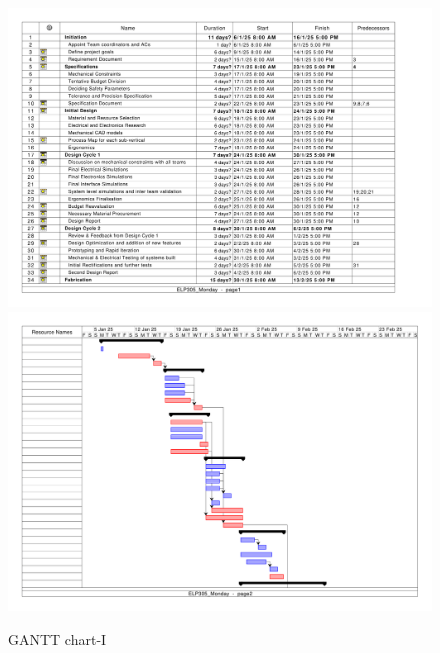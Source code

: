 \documentclass[12pt,a4paper]{article}
\begin{document}
\clearpage

\begin{figure}[H]
    \centering
    \includegraphics[width=1.2\textwidth]{gantt_new-1.png} %
    \includegraphics[width=1.2\textwidth]{gantt_new-2.png} %
    \caption{GANTT chart-I}
    
    \label{fig:GANTT CHART}
\end{figure}
\end{document}
